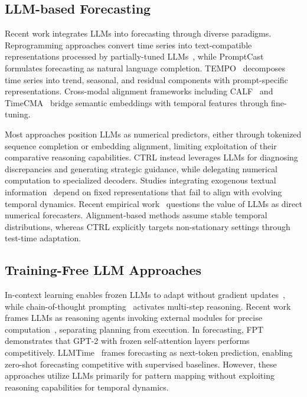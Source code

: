 




\subsection{LLM-based Forecasting}
Recent work integrates LLMs into forecasting through diverse paradigms. Reprogramming approaches convert time series into text-compatible representations processed by partially-tuned LLMs~\cite{Jin2024TimeLLM,zhou2023onefitsall}, while PromptCast~\cite{Xue2023PromptCast} formulates forecasting as natural language completion. TEMPO~\cite{Cao2024TEMPO} decomposes time series into trend, seasonal, and residual components with prompt-specific representations. Cross-modal alignment frameworks including CALF~\cite{Liu2025CALF} and TimeCMA~\cite{Liu2025TimeCMA} bridge semantic embeddings with temporal features through fine-tuning.

Most approaches position LLMs as numerical predictors, either through tokenized sequence completion or embedding alignment, limiting exploitation of their comparative reasoning capabilities. CTRL instead leverages LLMs for diagnosing discrepancies and generating strategic guidance, while delegating numerical computation to specialized decoders. Studies integrating exogenous textual information~\cite{Zhou2025Unveiling,Jiang2025Explainable} depend on fixed representations that fail to align with evolving temporal dynamics. Recent empirical work~\cite{Tan2024LLMUseful,park2025revisiting} questions the value of LLMs as direct numerical forecasters. Alignment-based methods assume stable temporal distributions, whereas CTRL explicitly targets non-stationary settings through test-time adaptation.

\subsection{Training-Free LLM Approaches}

In-context learning enables frozen LLMs to adapt without gradient updates~\cite{brown2020gpt3}, while chain-of-thought prompting~\cite{wei2022cot} activates multi-step reasoning. Recent work frames LLMs as reasoning agents invoking external modules for precise computation~\cite{schick2023toolformer,yao2023react}, separating planning from execution.
In forecasting, FPT~\cite{zhou2023onefitsall} demonstrates that GPT-2 with frozen self-attention layers performs competitively. LLMTime~\cite{gruver2023llmtime} frames forecasting as next-token prediction, enabling zero-shot forecasting competitive with supervised baselines. However, these approaches utilize LLMs primarily for pattern mapping without exploiting reasoning capabilities for temporal dynamics.

